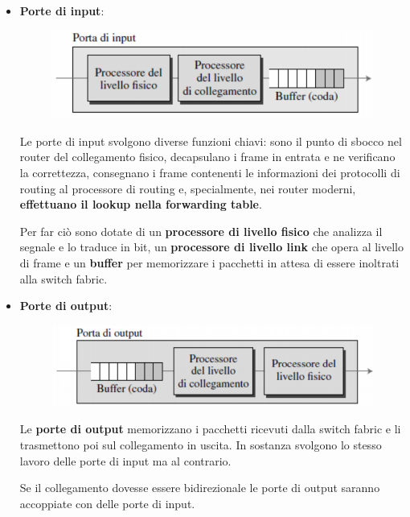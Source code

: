 \documentclass[11pt,a4paper,oneside]{book}
\theoremstyle{definition}
\begin{document}
\begin{itemize}
	\item \textbf{Porte di input}:
	      \begin{figure}[!h]
		      \includegraphics[scale=0.4]{Immagini/In_port.png}
		      \centering
	      \end{figure}

	      Le porte di input svolgono diverse funzioni chiavi: sono il punto di sbocco nel router del collegamento fisico, decapsulano i frame in entrata e ne verificano la correttezza, consegnano i frame contenenti le informazioni dei protocolli di routing al processore di routing e, specialmente, nei router moderni, \textbf{effettuano il lookup nella forwarding table}.

	      Per far ciò sono dotate di un \textbf{processore di livello fisico} che analizza il segnale e lo traduce in bit, un \textbf{processore di livello link} che opera al livello di frame e un \textbf{buffer} per memorizzare i pacchetti in attesa di essere inoltrati alla switch fabric.

	      \pagebreak

	\item \textbf{Porte di output}:

	      \begin{figure}[!h]
		      \includegraphics[scale=0.3]{Immagini/Out_port.png}
		      \centering
	      \end{figure}

	      Le \textbf{porte di output} memorizzano i pacchetti ricevuti dalla switch fabric e li trasmettono poi sul collegamento in uscita. In sostanza svolgono lo stesso lavoro delle porte di input ma al contrario.

	      Se il collegamento dovesse essere bidirezionale le porte di output saranno accoppiate con delle porte di input.


\end{itemize}
\end{document}
